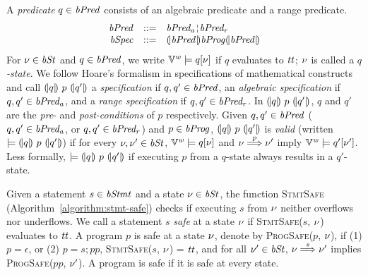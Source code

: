 A \emph{predicate} $q \in \mathit{bPred}$ consists of an algebraic predicate and a range predicate.
\[
\begin{array}{rcl}
  \bvPred & ::= & \bvPreda \andar \bvPredr \\
  \bvSpec & ::= & \cond{\bvPred} \bvProg \cond{\bvPred}
\end{array}
\]
For $\nu \in \mathit{bSt}$ and $q \in \mathit{bPred}$, we write $\mathbb{V}^{\mathit{w}} \models q[\nu]$ if $q$ evaluates to $\mathit{tt}$; $\nu$ is called a \emph{$q$-state}.
We follow Hoare's formalism in specifications of mathematical constructs~\cite{H:69:ABCP} and call ${(\!|}{q}{|\!)}~{p}~{(\!|}{q'}{|\!)}$ a \emph{specification} if $q,q' \in \mathit{bPred}$, an \emph{algebraic specification} if $q,q' \in \mathit{bPred_a}$, and a \emph{range specification} if $q,q' \in \mathit{bPred_r}$.
In ${(\!|}{q}{|\!)}~{p}~{(\!|}{q'}{|\!)}$, $q$ and $q'$ are the \emph{pre}- and \emph{post-conditions} of $p$ respectively.
Given $q, q' \in \mathit{bPred}$ ($q,q' \in \mathit{bPred_a}$, or $q,q' \in \mathit{bPred_r}$) and $p \in \mathit{bProg}$, ${(\!|}{q}{|\!)}~{p}~{(\!|}{q'}{|\!)}$ is \emph{valid} (written $\models {(\!|}{q}{|\!)}~{p}~{(\!|}{q'}{|\!)}$) if for every $\nu, \nu' \in \mathit{bSt}$, $\mathbb{V}^{\mathit{w}} \models q[\nu]$ and $\nu \overset{p}{\Longrightarrow} \nu'$ imply $\mathbb{V}^{\mathit{w}} \models q'[\nu']$.
Less formally, $\models {(\!|}{q}{|\!)}~{p}~{(\!|}{q'}{|\!)}$ if executing $p$ from a $q$-state always results in a $q'$-state.

Given a statement $s \in \mathit{bStmt}$ and a state $\nu \in \mathit{bSt}$, the function \textsc{StmtSafe} (Algorithm~\ref{algorithm:stmt-safe}) checks if executing $s$ from $\nu$ neither overflows nor underflows.
We call a statement $s$ \emph{safe} at a state $\nu$ if \textsc{StmtSafe}($s$, $\nu$) evaluates to $\mathit{tt}$.
A program $p$ is safe at a state $\nu$, denote by \textsc{ProgSafe}($p$, $\nu$), if (1) $p = \epsilon$, or (2) $p = s; pp$, \textsc{StmtSafe}($s$, $\nu$) = $\mathit{tt}$, and for all $\nu' \in \mathit{bSt}$, $\nu \overset{s}{\Longrightarrow} \nu'$ implies \textsc{ProgSafe}($pp$, $\nu'$).
A program is safe if it is safe at every state.

